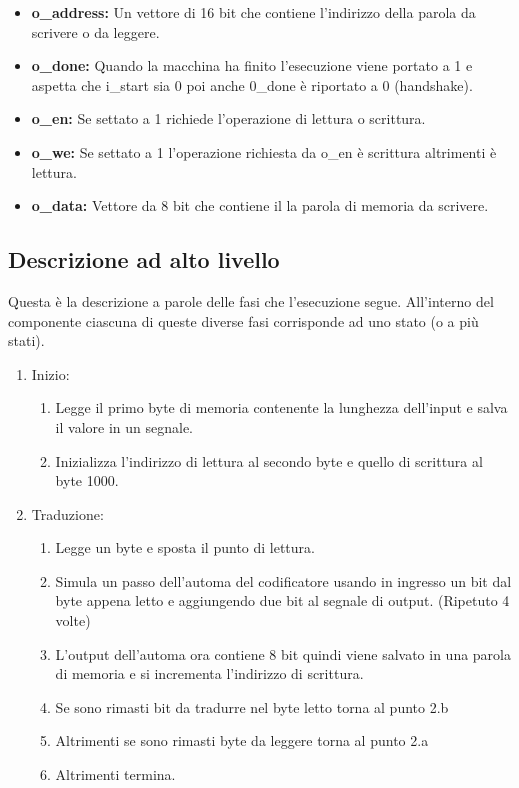 \documentclass{article}
\begin{document}
\begin{itemize}
	\item \textbf{o\_address:} Un vettore di 16 bit che contiene l'indirizzo della parola da scrivere o da leggere.
	\item \textbf{o\_done:} Quando la macchina ha finito l'esecuzione viene portato a 1 e aspetta che i\_start sia 0 poi anche 0\_done è riportato a 0 (handshake).
	\item \textbf{o\_en:} Se settato a 1 richiede l'operazione di lettura o scrittura.
	\item \textbf{o\_we:} Se settato a 1 l'operazione richiesta da o\_en è scrittura altrimenti è lettura.
	\item \textbf{o\_data:} Vettore da 8 bit che contiene il la parola di memoria da scrivere.
\end{itemize}
\pagebreak
\subsection{Descrizione ad alto livello}
Questa è la descrizione a parole delle fasi che l'esecuzione segue. All'interno del componente ciascuna di queste diverse fasi corrisponde ad uno stato (o a più stati).

\begin{enumerate}
	\item Inizio:
	\begin{enumerate}
		\item Legge il primo byte di memoria contenente la lunghezza dell'input e salva il valore in un segnale.
		\item Inizializza l'indirizzo di lettura al secondo byte e quello di scrittura al byte 1000.
	\end{enumerate}
	\item Traduzione:
	\begin{enumerate}
		\item Legge un byte e sposta il punto di lettura.
		\item Simula un passo dell'automa del codificatore usando in ingresso un bit dal byte appena letto e aggiungendo due bit al segnale di output. (Ripetuto 4 volte)
		\item L'output dell'automa ora contiene 8 bit quindi viene salvato in una parola di memoria e si incrementa l'indirizzo di scrittura.
		\item Se sono rimasti bit da tradurre nel byte letto torna al punto 2.b
		\item Altrimenti se sono rimasti byte da leggere torna al punto 2.a
		\item Altrimenti termina.
	\end{enumerate}
\end{enumerate}
\end{document}

